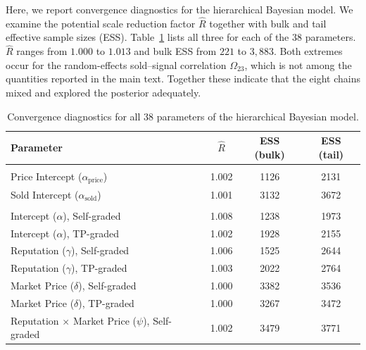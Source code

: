 \documentclass[11pt,letterpaper]{article}
\theoremstyle{definition}
\begin{document}
Here, we report convergence diagnostics for the hierarchical Bayesian model. We examine the potential scale reduction factor $\hat{R}$ together with bulk and tail effective sample sizes (ESS). Table~\ref{tab:convergence} lists all three for each of the 38 parameters. $\hat{R}$ ranges from $1.000$ to $1.013$ and bulk ESS from $221$ to $3{,}883$. Both extremes occur for the random-effects sold--signal correlation $\Omega_{23}$, which is not among the quantities reported in the main text. Together these indicate that the eight chains mixed and explored the posterior adequately.

\begin{table}[H]
\centering
\caption{Convergence diagnostics for all 38 parameters of the hierarchical Bayesian model.}\label{tab:convergence}
\fontsize{7}{8.4}\selectfont
\begin{tabular}[t]{lccc}
\toprule
\fontsize{8}{9.6}\selectfont Parameter & $\hat{R}$ & ESS (bulk) & ESS (tail)\\
\midrule
\addlinespace[0.3em]
\multicolumn{4}{l}{\fontsize{8}{9.6}\selectfont \textbf{Intercepts}}\\
\hspace{1em}Price Intercept ($\alpha_{\text{price}}$) & 1.002 & 1126 & 2131\\
\hspace{1em}Sold Intercept ($\alpha_{\text{sold}}$) & 1.001 & 3132 & 3672\\
\addlinespace[0.3em]
\multicolumn{4}{l}{\fontsize{8}{9.6}\selectfont \textbf{Signal Selection}}\\
\hspace{1em}Intercept ($\alpha$), Self-graded & 1.008 & 1238 & 1973\\
\hspace{1em}Intercept ($\alpha$), TP-graded & 1.002 & 1928 & 2155\\
\hspace{1em}Reputation ($\gamma$), Self-graded & 1.006 & 1525 & 2644\\
\hspace{1em}Reputation ($\gamma$), TP-graded & 1.003 & 2022 & 2764\\
\hspace{1em}Market Price ($\delta$), Self-graded & 1.000 & 3382 & 3536\\
\hspace{1em}Market Price ($\delta$), TP-graded & 1.000 & 3267 & 3472\\
\hspace{1em}Reputation $\times$ Market Price ($\psi$), Self-graded & 1.002 & 3479 & 3771\\

\end{tabular}
\end{table}
\end{document}
